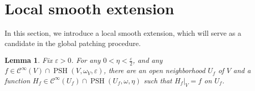 \documentclass[12pt,reqno]{amsart}
\newtheorem{lem}{Lemma}[section]
\newcommand{\PSH}{\operatorname{PSH}}
\newcommand{\restr}[2]{\left.#1\right|_{#2}}
\begin{document}
	
	
	
	\section{Local smooth extension}
	
	In this section, we introduce a local smooth extension, which will serve as a candidate in the global patching procedure.
	
	\begin{lem}\label{lem:local-smooth}
		Fix $\varepsilon>0$. For any  $0<\eta<\frac{\varepsilon}{2}$,  and  any  $f\in \mathcal C^\infty(V)\cap\PSH(V,\omega_V,\varepsilon)$, there are an open neighborhood $U_f$ of $V$ and a function $H_f\in \mathcal C^\infty(U_f)\cap\PSH(U_f,\omega,\eta)$ such that $\restr{H_f}{V}=f$ on $U_f$.
	\end{lem}
	
\end{document}
